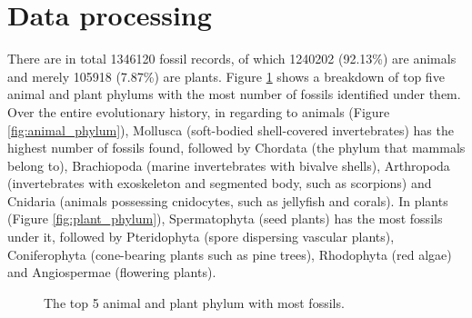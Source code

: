 \documentclass[11pt, a4paper,oneside,chapterprefix=false]{scrbook}
\begin{document}
\section{Data processing} \label{sec:result_data_processing}
There are in total 1346120 fossil records, of which 1240202 (92.13\%) are animals and merely 105918 (7.87\%) are plants. Figure \ref{fig:phylum} shows a breakdown of top five animal and plant phylums with the most number of fossils identified under them. Over the entire evolutionary history, in regarding to animals (Figure \ref{fig:animal_phylum}), Mollusca (soft-bodied shell-covered invertebrates) has the highest number of fossils found, followed by Chordata (the phylum that mammals belong to), Brachiopoda (marine invertebrates with bivalve shells), Arthropoda (invertebrates with exoskeleton and segmented body, such as scorpions) and Cnidaria (animals possessing cnidocytes, such as jellyfish and corals). In plants (Figure \ref{fig:plant_phylum}), Spermatophyta (seed plants) has the most fossils under it, followed by Pteridophyta (spore dispersing vascular plants), Coniferophyta (cone-bearing plants such as pine trees), Rhodophyta (red algae) and Angiospermae (flowering plants).

\begin{figure}[h]
	\centering
	\hfill
	\caption{The top 5 animal and plant phylum with most fossils.}
	\label{fig:phylum}
\end{figure}
\end{document}
